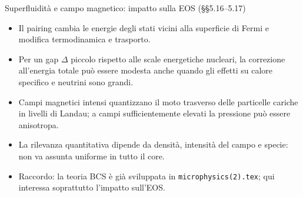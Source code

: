\begin{frame}[t]{Superfluidità e campo magnetico: impatto sulla EOS (§§5.16--5.17)}
\small
\begin{itemize}
\item Il pairing cambia le energie degli stati vicini alla superficie di Fermi e modifica termodinamica e trasporto.
\item Per un gap $\Delta$ piccolo rispetto alle scale energetiche nucleari, la correzione all'energia totale può essere modesta anche quando gli effetti su calore specifico e neutrini sono grandi.
\item Campi magnetici intensi quantizzano il moto trasverso delle particelle cariche in livelli di Landau; a campi sufficientemente elevati la pressione può essere anisotropa.
\item La rilevanza quantitativa dipende da densità, intensità del campo e specie: non va assunta uniforme in tutto il core.
\item Raccordo: la teoria BCS è già sviluppata in \texttt{microphysics(2).tex}; qui interessa soprattutto l'impatto sull'EOS.
\end{itemize}
\end{frame}


